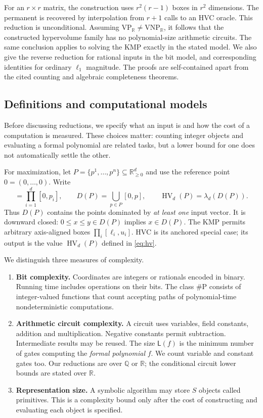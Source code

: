 \documentclass[12pt,a4paper]{article}
\theoremstyle{definition}
\theoremstyle{remark}
\newcommand{\R}{\mathbb R}
\newcommand{\Q}{\mathbb Q}
\newcommand{\HV}{\operatorname{HV}}
\newcommand{\VP}{\mathrm{VP}}
\newcommand{\VNP}{\mathrm{VNP}}
\newcommand{\size}{\mathsf L}
\begin{document}
For an $r\times r$ matrix, the construction uses $r^2(r-1)$ boxes in
$r^2$ dimensions. The permanent is recovered by interpolation from
$r+1$ calls to an HVC oracle. This reduction is unconditional.
Assuming $\VP_{\R}\ne\VNP_{\R}$, it follows that the constructed
hypervolume family has no polynomial-size arithmetic circuits. The
same conclusion applies to solving the KMP exactly in the stated model.
We also give the reverse reduction for rational inputs in the bit
model, and corresponding identities for ordinary $\ell_1$ magnitude.
The proofs are self-contained apart from the cited counting and
algebraic completeness theorems.

\subsection{Definitions and computational models}

Before discussing reductions, we specify what an input is and how the
cost of a computation is measured. These choices matter: counting
integer objects and evaluating a formal polynomial are related tasks,
but a lower bound for one does not automatically settle the other.

For maximization, let $P=\{p^1,\ldots,p^n\}\subseteq\R_{\ge0}^d$ and use
the reference point $0=(0,\ldots,0)$. Write
\begin{equation}
 [0,p]=\prod_{i=1}^d[0,p_i],\qquad
 D(P)=\bigcup_{p\in P}[0,p],\qquad
 \HV_d(P)=\lambda_d(D(P)).
 \label{eq:hv}
\end{equation}
Thus $D(P)$ contains the points dominated by \emph{at least one} input
vector. It is downward closed: $0\le x\le y\in D(P)$ implies $x\in D(P)$.
The KMP permits arbitrary axis-aligned boxes
$\prod_i[\ell_i,u_i]$. HVC is its anchored special case; its output is
the value $\HV_d(P)$ defined in \eqref{eq:hv}.

We distinguish three measures of complexity.
\begin{enumerate}
 \item \textbf{Bit complexity.} Coordinates are integers or rationals
 encoded in binary. Running time includes operations on their bits.
 The class $\#\mathrm P$ consists of integer-valued functions that count
 accepting paths of polynomial-time nondeterministic computations.
 \item \textbf{Arithmetic circuit complexity.} A circuit uses variables,
 field constants, addition and multiplication. Negative constants permit
 subtraction. Intermediate results may be reused. The size $\size(f)$ is
 the minimum number of gates computing the \emph{formal polynomial} $f$.
 We count variable and constant gates too. Our reductions are over
 $\Q$ or $\R$; the conditional circuit lower bounds are stated over $\R$.
 \item \textbf{Representation size.} A symbolic algorithm may store
 $S$ objects called primitives. This is a complexity bound only after the
 cost of constructing and evaluating each object is specified.
\end{enumerate}
\end{document}
